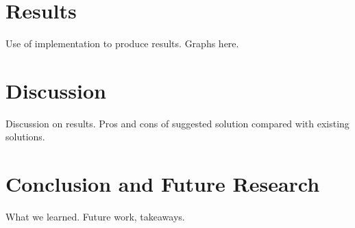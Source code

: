 \documentclass{article}
\begin{document}
\section{Results}

Use of implementation to produce results. Graphs here.

\section{Discussion}

Discussion on results. Pros and cons of suggested solution compared with existing solutions. 

\section{Conclusion and Future Research}

What we learned. Future work, takeaways.




\end{document}
